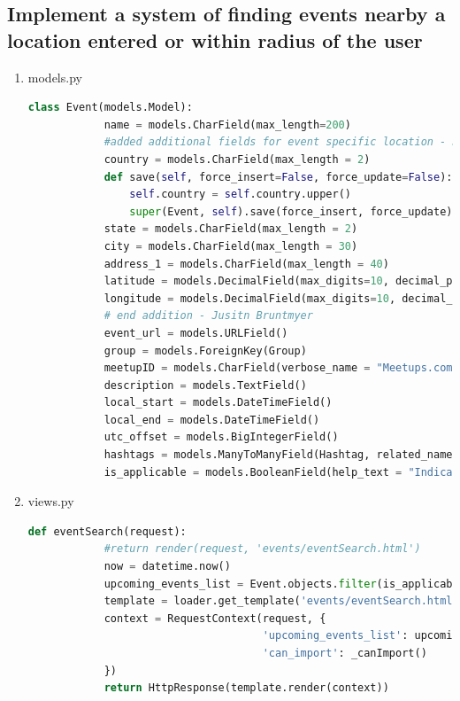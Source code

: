 \documentclass[letterpaper,10pt,onecolumn]{IEEEtran} %
\begin{document}
\subsection{Implement a system of finding events nearby a location entered or within radius of the user}

\begin{enumerate}
  \item models.py
    \begin{center}
      \begin{lstlisting}[language=Python]
        class Event(models.Model):
            name = models.CharField(max_length=200)
            #added additional fields for event specific location - Justin Bruntmyer
            country = models.CharField(max_length = 2)
            def save(self, force_insert=False, force_update=False):
                self.country = self.country.upper()
                super(Event, self).save(force_insert, force_update)
            state = models.CharField(max_length = 2)
            city = models.CharField(max_length = 30)
            address_1 = models.CharField(max_length = 40)
            latitude = models.DecimalField(max_digits=10, decimal_places=6)
            longitude = models.DecimalField(max_digits=10, decimal_places=6)
            # end addition - Jusitn Bruntmyer
            event_url = models.URLField()
            group = models.ForeignKey(Group)
            meetupID = models.CharField(verbose_name = "Meetups.com ID", max_length=50, unique=True)
            description = models.TextField()
            local_start = models.DateTimeField()
            local_end = models.DateTimeField()
            utc_offset = models.BigIntegerField()
            hashtags = models.ManyToManyField(Hashtag, related_name="events")
            is_applicable = models.BooleanField(help_text = "Indicates if an event is applicable to our audience or not.", default=True)
      \end{lstlisting}
    \end{center}

  \item views.py
    \begin{center}
      \begin{lstlisting}[language=Python]
        def eventSearch(request):
            #return render(request, 'events/eventSearch.html')
            now = datetime.now()
            upcoming_events_list = Event.objects.filter(is_applicable = True).filter(local_start__gte=now).order_by('local_start')
            template = loader.get_template('events/eventSearch.html')
            context = RequestContext(request, {
                                     'upcoming_events_list': upcoming_events_list,
                                     'can_import': _canImport()
            })
            return HttpResponse(template.render(context))
            

\end{lstlisting}
\end{center}
\end{enumerate}
\end{document}
